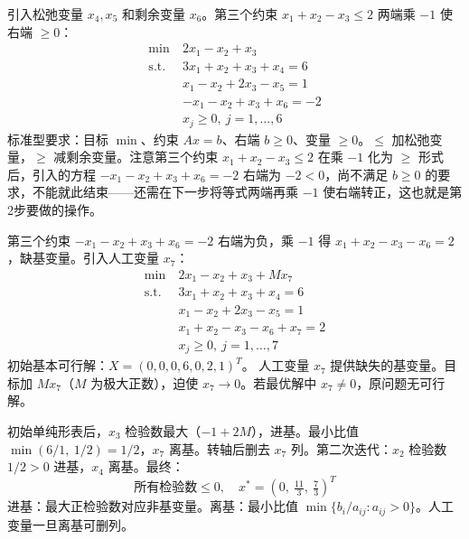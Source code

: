   {引入松弛变量 $x_4,x_5$ 和剩余变量 $x_6$。第三个约束 $x_1+x_2-x_3\le 2$ 两端乘 $-1$ 使右端 $\ge 0$：
  \begin{align*}
    \min\ & 2x_1 - x_2 + x_3 \\
    \text{s.t.}\ & 3x_1 + x_2 + x_3 + x_4 = 6 \\
    & x_1 - x_2 + 2x_3 - x_5 = 1 \\
    & -x_1 - x_2 + x_3 + x_6 = -2 \\
    & x_j \ge 0,\ j=1,\dots,6
  \end{align*}}
  {标准型要求：目标 $\min$、约束 $Ax=b$、右端 $b\ge 0$、变量 $\ge 0$。$\le$ 加松弛变量，$\ge$ 减剩余变量。注意第三个约束 $x_1+x_2-x_3\le 2$ 在乘 $-1$ 化为 $\ge$ 形式后，引入的方程 $-x_1-x_2+x_3+x_6=-2$ 右端为 $-2<0$，尚不满足 $b\ge 0$ 的要求，不能就此结束——还需在下一步将等式两端再乘 $-1$ 使右端转正，这也就是第2步要做的操作。}
  {\par\vspace{4pt}}
  {第三个约束 $-x_1-x_2+x_3+x_6=-2$ 右端为负，乘 $-1$ 得 $x_1+x_2-x_3-x_6=2$，缺基变量。引入人工变量 $x_7$：
  \begin{align*}
    \min\ & 2x_1 - x_2 + x_3 + Mx_7 \\
    \text{s.t.}\ & 3x_1 + x_2 + x_3 + x_4 = 6 \\
    & x_1 - x_2 + 2x_3 - x_5 = 1 \\
    & x_1 + x_2 - x_3 - x_6 + x_7 = 2 \\
    & x_j \ge 0,\ j=1,\dots,7
  \end{align*}
  初始基本可行解：$X = (0,0,0,6,0,2,1)^T$。}
  {人工变量 $x_7$ 提供缺失的基变量。目标加 $Mx_7$（$M$ 为极大正数），迫使 $x_7\to 0$。若最优解中 $x_7\neq 0$，原问题无可行解。}
  {\par\vspace{4pt}}
  {初始单纯形表后，$x_3$ 检验数最大（$-1+2M$），进基。最小比值 $\min(6/1,\ 1/2)=1/2$，$x_7$ 离基。转轴后删去 $x_7$ 列。第二次迭代：$x_2$ 检验数 $1/2>0$ 进基，$x_4$ 离基。最终：
  \[
  \text{所有检验数}\le 0,\quad x^* = (0,\ \tfrac{11}{3},\ \tfrac{7}{3})^T
  \]}
  {进基：最大正检验数对应非基变量。离基：最小比值 $\min\{b_i/a_{ij}: a_{ij}>0\}$。人工变量一旦离基可删列。}
  {\par\vspace{4pt}}
